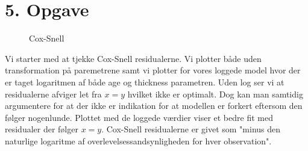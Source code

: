 \chapter{5. Opgave}
\begin{figure}[h]
    \centering
    \hfill
    \hfill
    \caption{Cox-Snell}
    \label{fig:enter-label}
\end{figure}
Vi starter med at tjekke Cox-Snell residualerne. Vi plotter både uden transformation på paremetrene samt vi plotter for vores loggede model hvor der er taget logaritmen af både age og thickness parametren. Uden log ser vi at residualerne afviger let fra $x=y$ hvilket ikke er optimalt. Dog kan man samtidig argumentere for at der ikke er indikation for at modellen er forkert eftersom den følger nogenlunde. Plottet med de loggede værdier viser et bedre fit med residualer der følger $x=y$. Cox-Snell residualerne er givet som "minus den naturlige logaritme af overlevelsessandsynligheden for hver observation".\\\\
